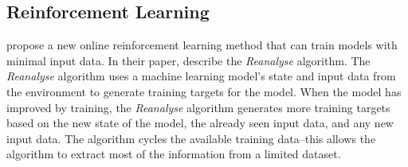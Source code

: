 \subsection{Reinforcement Learning}
  \citet{onlineRL} propose a new online reinforcement learning method that can train models with minimal input data.
  In their paper, \citeauthor{onlineRL} describe the \textit{Reanalyse} algorithm.
  The \textit{Reanalyse} algorithm uses a machine learning model's state and input data from the environment to generate training targets for the model.
  When the model has improved by training, the \textit{Reanalyse} algorithm generates more training targets based on the new state of the model, the already seen input data, and any new input data.
  The algorithm cycles the available training data--this allows the algorithm to extract most of the information from a limited dataset.
